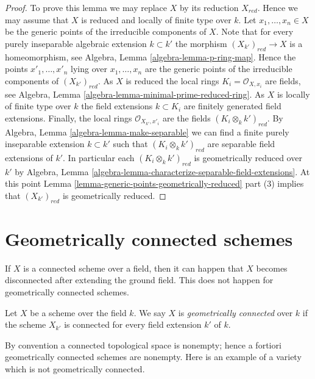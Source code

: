 \begin{proof}
To prove this lemma we may replace $X$ by its reduction $X_{red}$.
Hence we may assume that $X$ is reduced and locally of finite type
over $k$.
Let $x_1, \ldots, x_n \in X$ be the generic points of the irreducible
components of $X$.
Note that for every purely inseparable algebraic extension $k \subset k'$
the morphism $(X_{k'})_{red} \to X$ is a homeomorphism, see
Algebra, Lemma \ref{algebra-lemma-p-ring-map}. Hence the points
$x'_1, \ldots, x'_n$ lying over $x_1, \ldots, x_n$ are the generic
points of the irreducible components of $(X_{k'})_{red}$.
As $X$ is reduced the local rings $K_i = \mathcal{O}_{X, x_i}$ are fields, see
Algebra, Lemma \ref{algebra-lemma-minimal-prime-reduced-ring}.
As $X$ is locally of finite type over $k$ the field extensions
$k \subset K_i$ are finitely generated field extensions.
Finally, the local rings $\mathcal{O}_{X_{k'}, x'_i}$ are the
fields $(K_i \otimes_k k')_{red}$. By
Algebra, Lemma \ref{algebra-lemma-make-separable}
we can find a finite purely inseparable extension $k \subset k'$
such that $(K_i \otimes_k k')_{red}$ are separable field
extensions of $k'$. In particular each $(K_i \otimes_k k')_{red}$
is geometrically reduced over $k'$ by
Algebra, Lemma \ref{algebra-lemma-characterize-separable-field-extensions}.
At this point
Lemma \ref{lemma-generic-points-geometrically-reduced} part (3)
implies that $(X_{k'})_{red}$ is geometrically reduced.
\end{proof}






\section{Geometrically connected schemes}
\label{section-geometrically-connected}

\noindent
If $X$ is a connected scheme over a field, then it can happen that $X$
becomes disconnected after extending the ground field. This does not happen
for geometrically connected schemes.

\begin{definition}
\label{definition-geometrically-connected}
Let $X$ be a scheme over the field $k$. We say $X$ is
{\it geometrically connected} over $k$ if the scheme $X_{k'}$ is connected
for every field extension $k'$ of $k$.
\end{definition}

\noindent
By convention a connected topological space is nonempty; hence a fortiori
geometrically connected schemes are nonempty.
Here is an example of a variety which is not geometrically connected.

